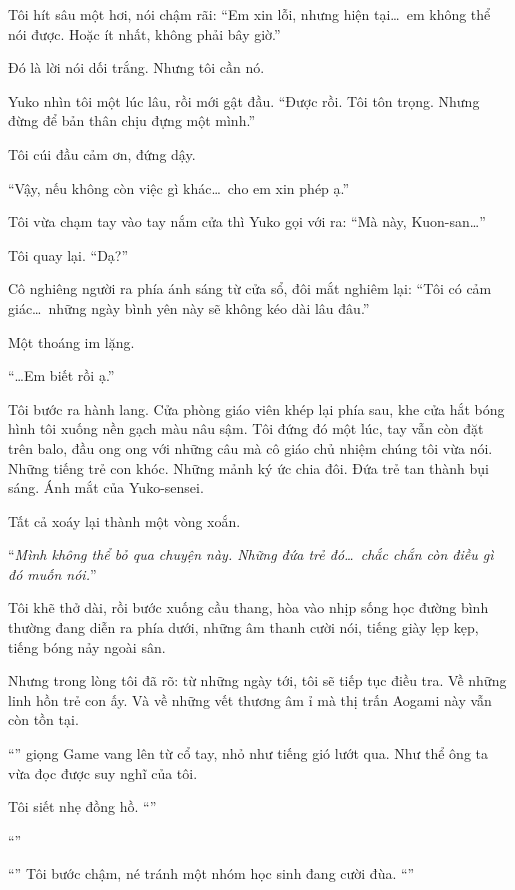 \documentclass[../main.tex]{subfiles}
\begin{document}
Tôi hít sâu một hơi, nói chậm rãi: ``Em xin lỗi, nhưng hiện tại\dots\ em không thể nói được. Hoặc ít nhất, không phải bây giờ.''

Đó là lời nói dối trắng. Nhưng tôi cần nó.

Yuko nhìn tôi một lúc lâu, rồi mới gật đầu. ``Được rồi. Tôi tôn trọng. Nhưng đừng để bản thân chịu đựng một mình.''

Tôi cúi đầu cảm ơn, đứng dậy.

``Vậy, nếu không còn việc gì khác\dots\ cho em xin phép ạ.''

Tôi vừa chạm tay vào tay nắm cửa thì Yuko gọi với ra: ``Mà này, Kuon-san\dots''

Tôi quay lại. ``Dạ?''

Cô nghiêng người ra phía ánh sáng từ cửa sổ, đôi mắt nghiêm lại: ``Tôi có cảm giác\dots\ những ngày bình yên này sẽ không kéo dài lâu đâu.''

Một thoáng im lặng.

``\dots Em biết rồi ạ.''

Tôi bước ra hành lang. Cửa phòng giáo viên khép lại phía sau, khe cửa hắt bóng hình tôi xuống nền gạch màu nâu sậm. Tôi đứng đó một lúc, tay vẫn còn đặt trên balo, đầu ong ong với những câu mà cô giáo chủ nhiệm chúng tôi vừa nói. Những tiếng trẻ con khóc. Những mảnh ký ức chia đôi. Đứa trẻ tan thành bụi sáng. Ánh mắt của Yuko-sensei.

Tất cả xoáy lại thành một vòng xoắn.

``\textit{Mình không thể bỏ qua chuyện này.
  Những đứa trẻ đó\dots\ chắc chắn còn điều gì đó muốn nói.}''

Tôi khẽ thở dài, rồi bước xuống cầu thang, hòa vào nhịp sống học đường bình thường đang diễn ra phía dưới, những âm thanh cười nói, tiếng giày lẹp kẹp, tiếng bóng nảy ngoài sân.

Nhưng trong lòng tôi đã rõ: từ những ngày tới, tôi sẽ tiếp tục điều tra. Về những linh hồn trẻ con ấy. Và về những vết thương âm ỉ mà thị trấn Aogami này vẫn còn tồn tại.

``'' giọng Game vang lên từ cổ tay, nhỏ như tiếng gió lướt qua. Như thể ông ta vừa đọc được suy nghĩ của tôi.

Tôi siết nhẹ đồng hồ. ``''

``''

``'' Tôi bước chậm, né tránh một nhóm học sinh đang cười đùa. ``''
\end{document}
